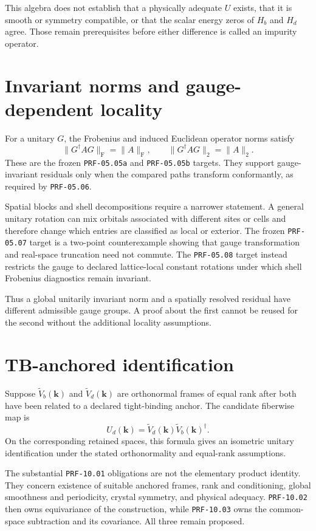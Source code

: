 This algebra does not establish that a physically adequate $U$ exists, that it
is smooth or symmetry compatible, or that the scalar energy zeros of $H_b$ and
$H_d$ agree. Those remain prerequisites before either difference is called an
impurity operator.

\section{Invariant norms and gauge-dependent locality}


For a unitary $G$, the Frobenius and induced Euclidean operator norms satisfy
\begin{equation}
  \|G^{\dagger}AG\|_{\mathrm F}=\|A\|_{\mathrm F},
  \qquad
  \|G^{\dagger}AG\|_2=\|A\|_2.
\end{equation}
These are the frozen \texttt{PRF-05.05a} and \texttt{PRF-05.05b} targets. They
support gauge-invariant residuals only when the compared paths transform
conformantly, as required by \texttt{PRF-05.06}.

Spatial blocks and shell decompositions require a narrower statement. A general
unitary rotation can mix orbitals associated with different sites or cells and
therefore change which entries are classified as local or exterior. The frozen
\texttt{PRF-05.07} target is a two-point counterexample showing that gauge
transformation and real-space truncation need not commute. The
\texttt{PRF-05.08} target instead restricts the gauge to declared lattice-local
constant rotations under which shell Frobenius diagnostics remain invariant.

Thus a global unitarily invariant norm and a spatially resolved residual have
different admissible gauge groups. A proof about the first cannot be reused for
the second without the additional locality assumptions.

\section{TB-anchored identification}


Suppose $\widetilde V_b(\mathbf k)$ and
$\widetilde V_d(\mathbf k)$ are orthonormal frames of equal rank after both have
been related to a declared tight-binding anchor. The candidate fiberwise map is
\begin{equation}
  U_d(\mathbf k)
  =
  \widetilde V_d(\mathbf k)
  \widetilde V_b(\mathbf k)^{\dagger}.
\end{equation}
On the corresponding retained spaces, this formula gives an isometric unitary
identification under the stated orthonormality and equal-rank assumptions.

The substantial \texttt{PRF-10.01} obligations are not the elementary product
identity. They concern existence of suitable anchored frames, rank and
conditioning, global smoothness and periodicity, crystal symmetry, and physical
adequacy. \texttt{PRF-10.02} then owns equivariance of the construction, while
\texttt{PRF-10.03} owns the common-space subtraction and its covariance. All
three remain proposed.
